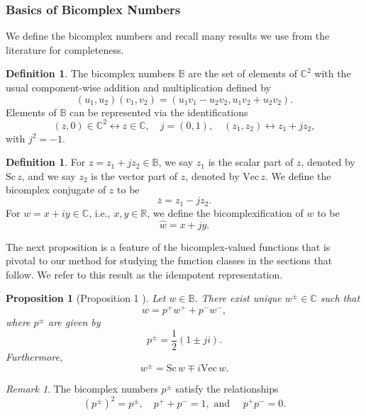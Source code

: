 \documentclass[12pt,reqno]{amsart}
\newtheorem{prop}[theorem]{Proposition}
\theoremstyle{definition}
\newtheorem{deff}[theorem]{Definition}
\theoremstyle{remark}
\newtheorem{comm}[theorem]{Remark}
\newcommand{\R}{\mathbb R}
\newcommand{\C}{\mathbb C}
\newcommand{\bc}{\mathbb{B}}
\newcommand{\sca}{\text{Sc}\,}
\newcommand{\vect}{\text{Vec}\,}
\begin{document}
            \subsubsection{Basics of Bicomplex Numbers}

        We define the bicomplex numbers and recall many results we use from the literature for completeness.

    \begin{deff}
        The bicomplex numbers $\bc$ are the set of elements of $\C^2$ with the usual component-wise addition and multiplication defined by 
        \[
            (u_1, u_2)(v_1, v_2) = (u_1v_1 - u_2v_2, u_1v_2 + u_2 v_2).
        \]
        Elements of $\bc$ can be represented via the identifications
        \[
            (z,0) \in \mathbb{C}^2 \leftrightarrow z \in \mathbb{C}, \quad j = (0,1), \quad (z_1, z_2) \leftrightarrow z_1 + j z_2,
        \]
        with $j^2 = -1$. 
    \end{deff}


    
    
    

    \begin{deff}
        For $z = z_1 + jz_2 \in \bc$, we say $z_1$ is the scalar part of $z$, denoted by $\sca z$, and we say $z_2$ is the vector part of $z$, denoted by $\vect z$. We define the bicomplex conjugate of $z$ to be 
        \[
            \overline{z} = z_1 - j z_2.
        \]
        For $w = x + i y \in \C$, i.e., $x, y \in \R$, we define the bicomplexification of $w$ to be 
        \[
            \widehat{w} = x + jy.
        \]  
    \end{deff}

    The next proposition is a feature of the bicomplex-valued functions that is pivotal to our method for studying the function classes in the sections that follow. We refer to this result as the idempotent representation.



    \begin{prop}[Proposition 1 \cite{BCTransmutation}]\label{everybchasplusandminus}
    Let $w \in \bc$. There exist unique $w^{\pm} \in \C$ such that 
    \[
        w = p^+ w^+ + p^- w^-,
    \]
    where $p^\pm$ are given by
    \[
        p^\pm = \frac{1}{2}(1 \pm ji).
    \]
    Furthermore, 
    \[
    w^{\pm} = \sca w \mp i \vect w.
    \]
    \end{prop}

    \begin{comm}
        The bicomplex numbers $p^\pm$ satisfy the relationships
        \[
            (p^\pm)^2 = p^\pm, \quad p^+ + p^- = 1, \text{ and } \quad p^+p^- = 0.
        \]
    \end{comm}
\end{document}
